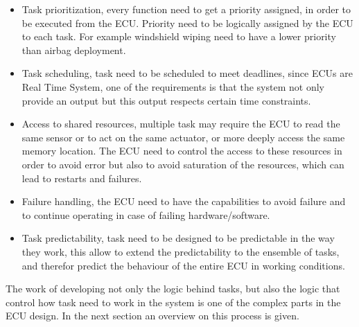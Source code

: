 \documentclass[../main.tex]{subfiles}
\begin{document}
\begin{itemize}
    \item Task prioritization, every function need to get a priority assigned, in order to be executed from the \gls{ECU}. Priority need to be logically assigned by the \gls{ECU} to each task. For example windshield wiping need to have a lower priority than airbag deployment. 
    \item Task scheduling, task need to be scheduled to meet deadlines, since \gls{ECU}s are Real Time System, one of the requirements is that the system not only provide an output but this output respects certain time constraints.
    \item Access to shared resources, multiple task may require the \gls{ECU} to read the same sensor or to act on the same actuator, or more deeply access the same memory location. The \gls{ECU} need to control the access to these resources in order to avoid error but also to avoid saturation of the resources, which can lead to restarts and failures.  
    \item Failure handling, the \gls{ECU} need to have the capabilities to avoid failure and to continue operating in case of failing hardware/software.
    \item Task predictability, task need to be designed to be predictable in the way they work, this allow to extend the predictability to the ensemble of tasks, and therefor predict the behaviour of the entire \gls{ECU} in working conditions. 
\end{itemize}
The work of developing not only the logic behind tasks, but also the logic that control how task need to work in the system is one of the complex parts in the \gls{ECU} design. In the next section an overview on this process is given. 
\end{document}
